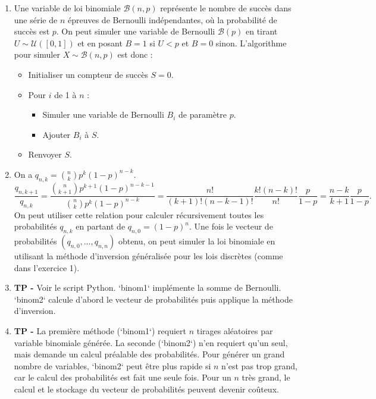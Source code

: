\documentclass[solutions]{exercices}
\begin{document}
\begin{solution}
\begin{enumerate}
  \item Une variable de loi binomiale $\mathcal{B}(n,p)$ représente le nombre de succès dans une série de $n$ épreuves de Bernoulli indépendantes, où la probabilité de succès est $p$. On peut simuler une variable de Bernoulli $\mathcal{B}(p)$ en tirant $U \sim \mathcal{U}([0,1])$ et en posant $B=1$ si $U < p$ et $B=0$ sinon.
  L'algorithme pour simuler $X \sim \mathcal{B}(n,p)$ est donc :
  \begin{itemize}
      \item Initialiser un compteur de succès $S=0$.
      \item Pour $i$ de 1 à $n$ :
      \begin{itemize}
          \item Simuler une variable de Bernoulli $B_i$ de paramètre $p$.
          \item Ajouter $B_i$ à $S$.
      \end{itemize}
      \item Renvoyer $S$.
  \end{itemize}
  \item On a $q_{n,k} = \binom{n}{k} p^k (1-p)^{n-k}$.
  \[ \frac{q_{n,k+1}}{q_{n,k}} = \frac{\binom{n}{k+1} p^{k+1} (1-p)^{n-k-1}}{\binom{n}{k} p^k (1-p)^{n-k}} = \frac{n!}{(k+1)!(n-k-1)!} \frac{k!(n-k)!}{n!} \frac{p}{1-p} = \frac{n-k}{k+1} \frac{p}{1-p}. \]
  On peut utiliser cette relation pour calculer récursivement toutes les probabilités $q_{n,k}$ en partant de $q_{n,0}=(1-p)^n$. Une fois le vecteur de probabilités $(q_{n,0}, \dots, q_{n,n})$ obtenu, on peut simuler la loi binomiale en utilisant la méthode d'inversion généralisée pour les lois discrètes (comme dans l'exercice 1).
  \item \textbf{TP -} Voir le script Python. `binom1` implémente la somme de Bernoulli. `binom2` calcule d'abord le vecteur de probabilités puis applique la méthode d'inversion.
  \item \textbf{TP -} La première méthode (`binom1`) requiert $n$ tirages aléatoires par variable binomiale générée. La seconde (`binom2`) n'en requiert qu'un seul, mais demande un calcul préalable des probabilités. Pour générer un grand nombre de variables, `binom2` peut être plus rapide si $n$ n'est pas trop grand, car le calcul des probabilités est fait une seule fois. Pour un $n$ très grand, le calcul et le stockage du vecteur de probabilités peuvent devenir coûteux.
\end{enumerate}
\end{solution}
\end{document}
